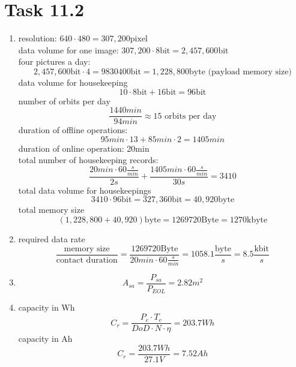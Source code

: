 \documentclass[a4paper,12pt]{article}
\begin{document}
\section*{Task 11.2}
\begin{enumerate}
 \item resolution: \qquad $640\cdot 480 = 307,200\text{pixel}$ \\ data volume for one image:  \qquad $307,200\cdot 8 \text{bit} = 2,457,600\text{bit}$\\ four pictures a day: \[2,457,600 \text{bit}\cdot 4 = 
 9830400 \text{bit} = 1,228,800 \text{byte  (payload memory size)}\] data volume for housekeeping \[10\cdot 8 \text{bit} + 16 \text{bit} = 96\text{bit}\] number of orbits per day 
 \[\frac{1440min}{94min} \approx 15 \text{ orbits per day}\] duration of offline operations: \[95 min \cdot 13 + 85min\cdot 2 = 1405min\] duration of online operation: 20min \\ total number of housekeeping records: \[\frac{20min\cdot 60\frac{s}{min}}{2s} + 
 \frac{1405min\cdot 60\frac{s}{min}}{30s} = 3410 \] total data volume for housekeepings \[3410 \cdot 96 \text{bit} = 327,360 \text{bit} = 40,920\text{byte}\] total memory size 
 \[(1,228,800 + 40,920)\text{byte} = 1269720 \text{Byte} = 1270\text{kbyte}\]
 \item required data rate \[\frac{\text{memory size}}{\text{contact duration}} = \frac{1269720 \text{Byte}}{20min\cdot 60 \frac{s}{min}} = 1058.1\frac{\text{byte}}{s} = 
 8.5\frac{\text{kbit}}{s}\]
 \item \[A_{sa} = \frac{P_{sa}}{P_{EOL}} = 2.82m^2\]
 \item capacity in Wh
 \[C_r = \frac{P_e\cdot T_e}{DoD\cdot N \cdot \eta} = 203.7Wh\]
 capacity in Ah 
 \[C_r = \frac{203.7Wh}{27.1V} = 7.52Ah\]
\end{enumerate}
\end{document}

